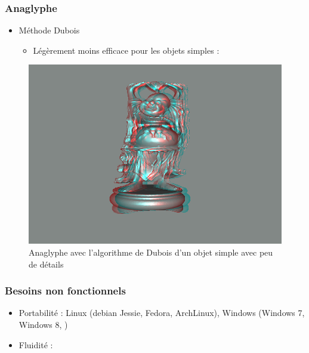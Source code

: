 \documentclass{beamer}
\begin{document}
%
% 
\begin{frame}
\frametitle{Anaglyphe}
\begin{itemize}[label=$\bullet$]
\item Méthode Dubois \cite{algoDubois}
	\begin{itemize}[label=$\circ$]
	\item Légèrement moins efficace pour les objets simples : 
	\end{itemize}
\end{itemize}
\begin{figure}
\centering
\includegraphics[scale=0.35]{happy_dubois.png}
\caption{Anaglyphe avec l'algorithme de Dubois d'un objet simple avec peu de détails}
\end{figure}
\end{frame}

\begin{frame}
\frametitle{Besoins non fonctionnels}
\begin{itemize}[label=$\bullet$]
 	\item Portabilité : Linux (debian Jessie, Fedora, ArchLinux), Windows (Windows 7, Windows 8, )
	\item Fluidité : 
\end{itemize}

\end{frame}

\end{document}

